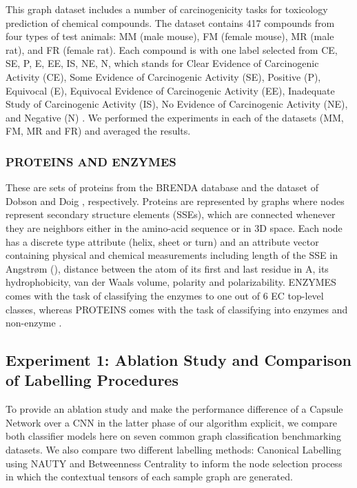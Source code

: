 \documentclass[conference]{IEEEtran}
\begin{document}
This graph dataset includes a number of carcinogenicity tasks for toxicology prediction of chemical compounds. The dataset contains 417 compounds from four types of test animals: MM (male mouse), FM (female mouse), MR (male rat), and FR (female rat). Each compound is with one label selected from {CE, SE, P, E, EE, IS, NE, N}, which stands for Clear Evidence of Carcinogenic Activity (CE), Some Evidence of Carcinogenic Activity (SE), Positive (P), Equivocal (E), Equivocal Evidence of Carcinogenic Activity (EE), Inadequate Study of Carcinogenic Activity (IS), No Evidence of Carcinogenic Activity (NE), and Negative (N) \cite{pan2017task}. We performed the experiments in each of the datasets (MM, FM, MR and FR) and averaged the results.

\subsubsection*{PROTEINS AND ENZYMES}

These are sets of proteins from the BRENDA database \cite{schomburg2004brenda} and the dataset of Dobson and Doig \cite{dobson2003distinguishing}, respectively. Proteins are represented by graphs where nodes represent secondary structure elements (SSEs), which are connected whenever they are neighbors either in the amino-acid sequence or in 3D space. Each node has a discrete type attribute (helix, sheet or turn) and an attribute vector containing physical and chemical measurements including length of the SSE in Angstrøm (), distance between the  atom of its first and last residue in A, its hydrophobicity, van der Waals volume, polarity and polarizability. ENZYMES comes with the task of classifying the enzymes to one out of 6 EC top-level classes, whereas PROTEINS comes with the task of classifying into enzymes and non-enzyme \cite{feragen2013scalable}.
 



\subsection{Experiment 1: Ablation Study and Comparison of Labelling Procedures}
To provide an ablation study and make the performance difference of a Capsule Network over a CNN in the latter phase of our algorithm explicit, we compare both classifier models here on seven common graph classification benchmarking datasets. We also compare two different labelling methods: Canonical Labelling using NAUTY \cite{mckay2014practical} and Betweenness Centrality \cite{brandes2001faster} to inform the node selection process in which the contextual tensors of each sample graph are generated.
\end{document}
